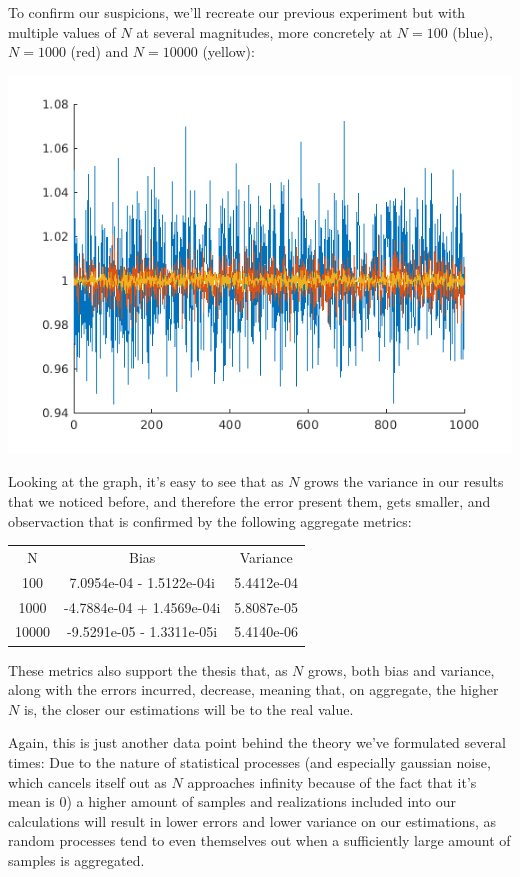 \documentclass[conference,9pt]{IEEEtran}
\begin{document}
To confirm our suspicions, we'll recreate our previous experiment but with multiple values of $N$ at several magnitudes, more concretely at $N=100$ (blue), $N=1000$ (red) and $N=10000$ (yellow):

\includegraphics[scale=0.6]{b6}

Looking at the graph, it's easy to see that as $N$ grows the variance in our results that we noticed before, and therefore the error present them, gets smaller, and observaction that is confirmed by the following aggregate metrics:

\begin{center}
  \begin{tabular}{ c c c }
   N & Bias & Variance \\ 
   100 & 7.0954e-04 - 1.5122e-04i & 5.4412e-04 \\  
   1000 & -4.7884e-04 + 1.4569e-04i & 5.8087e-05 \\  
   10000 & -9.5291e-05 - 1.3311e-05i & 5.4140e-06  
  \end{tabular}
\end{center}

These metrics also support the thesis that, as $N$ grows, both bias and variance, along with the errors incurred, decrease, meaning that, on aggregate, the higher $N$ is, the closer our estimations will be to the real value.

Again, this is just another data point behind the theory we've formulated several times: Due to the nature of statistical processes (and especially gaussian noise, which cancels itself out as $N$ approaches infinity because of the fact that it's mean is 0) a higher amount of samples and realizations included into our calculations will result in lower errors and lower variance on our estimations, as random processes tend to even themselves out when a sufficiently large amount of samples is aggregated.
\end{document}
